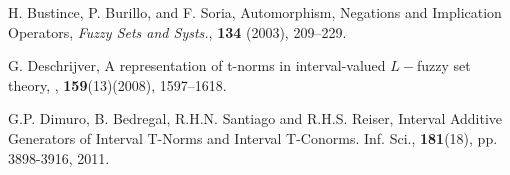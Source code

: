 \documentclass[12pt]{article}
\theoremstyle{plain}
\theoremstyle{remark}
\theoremstyle{definition}
\theoremstyle{proposition}
\begin{document}
\begin{thebibliography}{8}
{ H. Bustince, P. Burillo, and F. Soria, Automorphism, Negations and Implication Operators,
{\it Fuzzy Sets and Systs.}, \textbf{134} (2003),
209--229.


%
%

%
 G. Deschrijver, A representation of t-norms in interval-valued $L-$fuzzy set theory,
, \textbf{159}(13)(2008), 1597--1618.

G.P. Dimuro, B. Bedregal, R.H.N. Santiago and R.H.S. Reiser,
Interval Additive  Generators of Interval T-Norms and Interval T-Conorms.
Inf. Sci., \textbf{181}(18), pp. 3898-3916, 2011.




%
%
%

}
\end{thebibliography}
\end{document}
